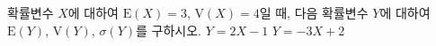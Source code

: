 확률변수 $X$에 대하여 $\mathrm{E}(X)=3$, $\mathrm{V}(X)=4$일 때, 다음 확률변수 $Y$에 대하여 $\mathrm{E}(Y)$, $\mathrm{V}(Y)$, $\sigma(Y)$를 구하시오.
 $Y=2X-1$
 $Y=-3X+2$
